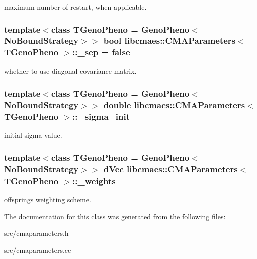 maximum number of restart, when applicable. \hypertarget{classlibcmaes_1_1CMAParameters_ad7f26f864149ce4d62169e15daa530fa}{
\subsubsection[{\-\_\-sep}]{\setlength{\rightskip}{0pt plus 5cm}template$<$class T\-Geno\-Pheno = Geno\-Pheno$<$\-No\-Bound\-Strategy$>$$>$ bool {\bf libcmaes\-::\-C\-M\-A\-Parameters}$<$ T\-Geno\-Pheno $>$\-::\-\_\-sep = false}}\label{classlibcmaes_1_1CMAParameters_ad7f26f864149ce4d62169e15daa530fa}
whether to use diagonal covariance matrix. \hypertarget{classlibcmaes_1_1CMAParameters_a8ad9eb52bd8ffcfc4ea175fef21c8f96}{
\subsubsection[{\-\_\-sigma\-\_\-init}]{\setlength{\rightskip}{0pt plus 5cm}template$<$class T\-Geno\-Pheno = Geno\-Pheno$<$\-No\-Bound\-Strategy$>$$>$ double {\bf libcmaes\-::\-C\-M\-A\-Parameters}$<$ T\-Geno\-Pheno $>$\-::\-\_\-sigma\-\_\-init}}\label{classlibcmaes_1_1CMAParameters_a8ad9eb52bd8ffcfc4ea175fef21c8f96}
initial sigma value. \hypertarget{classlibcmaes_1_1CMAParameters_aa8eeb4ea2a91da73f1d53fa74d950049}{
\subsubsection[{\-\_\-weights}]{\setlength{\rightskip}{0pt plus 5cm}template$<$class T\-Geno\-Pheno = Geno\-Pheno$<$\-No\-Bound\-Strategy$>$$>$ d\-Vec {\bf libcmaes\-::\-C\-M\-A\-Parameters}$<$ T\-Geno\-Pheno $>$\-::\-\_\-weights}}\label{classlibcmaes_1_1CMAParameters_aa8eeb4ea2a91da73f1d53fa74d950049}
offsprings weighting scheme. 

The documentation for this class was generated from the following files\-:\begin{DoxyCompactItemize}
\item 
src/cmaparameters.\-h\item 
src/cmaparameters.\-cc\end{DoxyCompactItemize}
